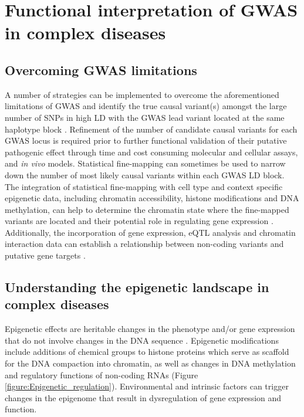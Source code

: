 \section{Functional interpretation of GWAS in complex diseases}

\subsection{Overcoming GWAS limitations}
A number of strategies can be implemented to overcome the aforementioned limitations of GWAS and identify the true causal variant(s) amongst the large number of SNPs in high LD with the GWAS lead variant located at the same haplotype block  \parencite{Edwards2013}. Refinement of the number of candidate causal variants for each GWAS locus is required prior to further functional validation of their putative pathogenic effect through time and cost consuming molecular and cellular assays, and \textit{in vivo} models. Statistical fine-mapping can sometimes be used to narrow down the number of most likely causal variants within each GWAS LD block. The integration of statistical fine-mapping with cell type and context specific epigenetic data, including chromatin accessibility, histone modifications and DNA methylation, can help to determine the chromatin state where the fine-mapped variants are located and their potential role in regulating gene expression \parencite{Petronis2010}. Additionally, the incorporation of gene expression, eQTL analysis and chromatin interaction data can establish a relationship between non-coding variants and putative gene targets \parencite{Calderon2018}.


\subsection{Understanding the epigenetic landscape in complex diseases}
\label{subsec:Epigenetics}

Epigenetic effects are heritable changes in the phenotype and/or gene expression that do not involve changes in the DNA sequence \parencite{Feil2012}. Epigenetic modifications include additions of chemical groups to histone proteins which serve as scaffold for the DNA compaction into chromatin, as well as changes in DNA methylation and regulatory functions of non-coding RNAs (Figure \ref{figure:Epigenetic_regulation}). Environmental and intrinsic factors can trigger changes in the epigenome that result in dysregulation of gene expression and function. 

